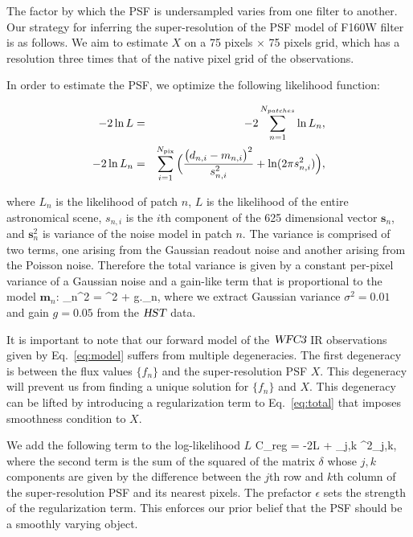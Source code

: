 The factor by which the PSF is undersampled varies from one filter to another. Our strategy for inferring the super-resolution of the PSF model of F160W filter is as follows. 
We aim to estimate $X$ on a 75 pixels $\times$ 75 pixels grid, which 
has a resolution three times that of the native pixel grid of the observations.

In order to estimate the PSF, we optimize the following likelihood function:

\begin{eqnarray} -2 \ln L &=& -2 \sum_{n=1}^{N_{patches}} \ln L_{n} \label{eq:total} , \\
-2 \ln L_{n} &=& \sum_{i=1}^{N_{\rm pix}} \Big( \frac{\big(d_{n,i} - m_{n,i} \big)^{2}}{s^{2}_{n,i}} + \ln(2 \pi s_{n,i}^{2}) \Big) \label{eq:patch},
\end{eqnarray}

where $L_{n}$ is the likelihood of patch $n$, $L$ is the likelihood of the entire astronomical scene, $s_{n,i}$ is the $i$th component of the 625 dimensional vector $\mathbf{s}_n$, and 
$\mathbf{s}_n^{2}$ is variance of the noise model in patch $n$. The variance is comprised of two terms, one arising from the Gaussian readout noise and another arising from the Poisson noise.
Therefore the total variance is given by a constant per-pixel variance of a Gaussian noise and a gain-like term that is proportional to the model $\mathbf{m}_{n}$:
\beq
{}_n^{2} = \sigma^{2} + g._{n},
\label{eq:variance}
\eeq
where we extract Gaussian variance $\sigma^{2}=0.01$ and gain $g=0.05$ from the ${\textsl{HST}}$ data. 

It is important to note that our forward model of the ${\textsl{WFC3}}$ IR 
observations given by Eq.~\ref{eq:model} suffers from multiple degeneracies. The first degeneracy is between 
the flux values $\{f_n\}$ and the super-resolution PSF $X$. This degeneracy will prevent us from finding a unique 
solution for $\{f_n\}$ and $X$. This degeneracy can be lifted by introducing a regularization term to Eq.~\ref{eq:total} that imposes 
smoothness condition to $X$. 

We add the following term to the log-likelihood $L$
\beq
C_{\rm reg} = -2\ln L + \epsilon \sum_{j,k} \delta^{2}_{j,k},
\label{eq:reg}
\eeq
where the second term is the sum of the squared of the matrix $\delta$ whose $j,k$ components are given by the difference between the $j$th row and $k$th column of the super-resolution PSF 
and its nearest pixels. The prefactor $\epsilon$ sets the strength of the regularization term. This enforces our prior belief that the PSF should be a smoothly varying object.


